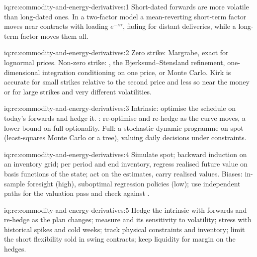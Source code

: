 \begin{solution}{iq:rc:commodity-and-energy-derivatives:1}
Short-dated forwards are more volatile than long-dated ones. In a two-factor model a
mean-reverting short-term factor moves near contracts with loading $e^{-\kappa\tau}$, fading
for distant deliveries, while a long-term factor moves them all.
\end{solution}

\begin{solution}{iq:rc:commodity-and-energy-derivatives:2}
Zero strike: Margrabe, exact for lognormal prices. Non-zero strike: ,
the Bjerksund--Stensland refinement, one-dimensional integration conditioning on one price,
or Monte Carlo. Kirk is accurate for small strikes relative to the second price and less so
near the money or for large strikes and very different volatilities.
\end{solution}

\begin{solution}{iq:rc:commodity-and-energy-derivatives:3}
Intrinsic: optimise the schedule on today's forwards and hedge it. :
re-optimise and re-hedge as the curve moves, a lower bound on full optionality. Full: a
stochastic dynamic programme on spot (least-squares Monte Carlo or a tree), valuing daily
decisions under constraints.
\end{solution}

\begin{solution}{iq:rc:commodity-and-energy-derivatives:4}
Simulate spot; backward induction on an inventory grid; per period and end inventory,
regress realised future value on basis functions of the state; act on the estimates, carry
realised values. Biases: in-sample foresight (high), suboptimal regression policies (low);
use independent paths for the valuation pass and check against .
\end{solution}

\begin{solution}{iq:rc:commodity-and-energy-derivatives:5}
Hedge the intrinsic with forwards and re-hedge as the plan changes; measure  and its sensitivity to volatility; stress with historical spikes and cold weeks; track
physical constraints and inventory; limit the short flexibility sold in swing contracts;
keep liquidity for margin on the hedges.
\end{solution}

